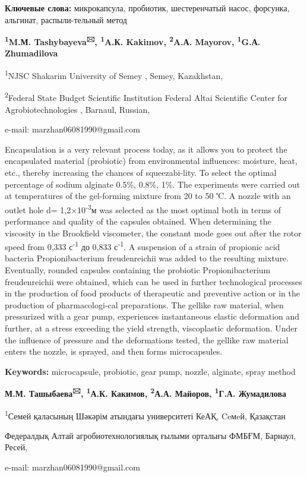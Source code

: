 {\bfseries Ключевые слова:} микрокапсула, пробиотик, шестеренчатый насос,
форсунка, альгинат, распыли-тельный метод

\begin{center}

{\bfseries \textsuperscript{1}M.М. Tashybayeva\textsuperscript{🖂},
\textsuperscript{1}A.К. Kakimov, \textsuperscript{2}A.А. Mayorov,
\textsuperscript{1}G.А. Zhumadilova}

\textsuperscript{1}NJSC Shakarim University of Semey , Semey,
Kazakhstan,

\textsuperscript{2}Federal State Budget Scientific Institution Federal
Altai Scientific Center for Agrobiotechnologies , Barnaul, Russian,

e-mail: marzhan06081990@gmail.com
\end{center}

Encapsulation is a very relevant process today, as it allows you to
protect the encapsulated material (probiotic) from environmental
influences: moisture, heat, etc., thereby increasing the chances of
squeezabi-lity. To select the optimal percentage of sodium alginate
0.5\%, 0.8\%, 1\%. The experiments were carried out at temperatures of
the gel-forming mixture from 20 to 50 ℃. A nozzle with an outlet hole d=
1,2×10\textsuperscript{-3}м was selected as the most optimal both in
terms of performance and quality of the capsules obtained. When
determining the viscosity in the Brookfield viscometer, the constant
mode goes out after the rotor speed from 0,333 с\textsuperscript{-1} до
0,833 с\textsuperscript{-1}. A suspension of a strain of propionic acid
bacteria Propionibacterium freudenreichii was added to the resulting
mixture. Eventually, rounded capsules containing the probiotic
Propionibacterium freudenreichii were obtained, which can be used in
further technological processes in the production of food products of
therapeutic and preventive action or in the production of
pharmacologi-cal preparations. The gellike raw material, when pressurized
with a gear pump, experiences instantaneous elastic deformation and
further, at a stress exceeding the yield strength, viscoplastic
deformation. Under the influence of pressure and the deformations
tested, the gellike raw material enters the nozzle, is sprayed, and then
forms microcapsules.

{\bfseries Keywords:} microcapsule, probiotic, gear pump, nozzle,
alginate, spray method

\begin{center}

{\bfseries М.М. Ташыбаева\textsuperscript{🖂}, \textsuperscript{1}А.К.
Какимов, \textsuperscript{2}А.А. Майоров, \textsuperscript{1}Г.А.
Жумадилова}

\textsuperscript{1}Семей қаласының Шәкәрім атындағы университеті КеАҚ, Ceмeй, Қазақстан

Федералдық Алтай агробиотехнологиялық ғылыми орталығы ФМБҒМ, Барнаул, Ресей,

e-mail: marzhan06081990@gmail.com
\end{center}

